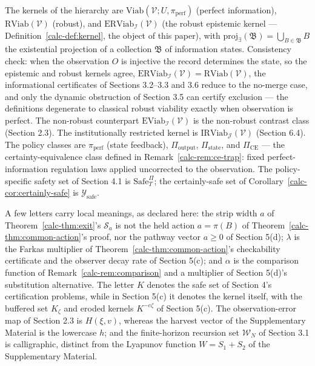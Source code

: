 \documentclass[10pt,twocolumn]{article}
\theoremstyle{definition}
\begin{document}
The kernels of the hierarchy are
\(\mathrm{Viab}(\mathcal{V}; U, \pi_{\mathrm{perf}})\) (perfect
information), \(\mathrm{RViab}(\mathcal{V})\) (robust), and
\(\mathrm{ERViab}_{\mathcal{I}}(\mathcal{V})\) (the robust epistemic
kernel --- Definition~\ref{calc-def:kernel}, the object of this paper), with
\(\mathrm{proj}_{\exists}(\mathfrak{B}) = \bigcup_{B \in \mathfrak{B}} B\)
the existential projection of a collection \(\mathfrak{B}\) of information states. Consistency check: when the observation \(O\) is injective the record determines the state, so the epistemic and robust kernels agree, \(\mathrm{ERViab}_{\mathcal{I}}(\mathcal{V}) = \mathrm{RViab}(\mathcal{V})\), the informational certificates of Sections 3.2--3.3 and 3.6 reduce to the no-merge case, and only the dynamic obstruction of Section 3.5 can certify exclusion --- the definitions degenerate to classical robust viability exactly when observation is perfect. The non-robust counterpart
\(\mathrm{EViab}_{\mathcal{I}}(\mathcal{V})\) is the non-robust contrast class (Section 2.3). The institutionally restricted kernel is \(\mathrm{IRViab}_{\mathcal{J}}(\mathcal{V})\) (Section 6.4). The policy classes
are \(\pi_{\mathrm{perf}}\) (state feedback), \(\Pi_{\mathrm{output}}\),
\(\Pi_{\mathrm{state}}\), and \(\Pi_{\mathrm{CE}}\) --- the
certainty-equivalence class defined in Remark~\ref{calc-rem:ce-trap}: fixed
perfect-information regulation laws applied uncorrected to the
observation. The policy-specific safety set of Section 4.1 is
\(\mathrm{Safe}^{\Pi}_T\); the certainly-safe set of Corollary~\ref{calc-cor:certainly-safe} is
\(\mathcal{Y}_{\mathrm{safe}}\).

A few letters carry local meanings, as declared here: the strip width \(a\) of
Theorem~\ref{calc-thm:exit}'s \(\mathcal{S}_a\) is not the held action
\(a = \pi(B)\) of Theorem~\ref{calc-thm:common-action}'s proof, nor the
pathway vector \(a \ge 0\) of Section 5(d); \(\lambda\) is the Farkas
multiplier of Theorem~\ref{calc-thm:common-action}'s checkability
certificate and the observer decay rate of Section 5(c); and
\(\alpha\) is the comparison function of Remark~\ref{calc-rem:comparison}
and a multiplier of Section 5(d)'s substitution alternative. The
letter \(K\) denotes the safe set of Section 4's certification
problems, while in Section 5(c) it denotes the kernel
itself, with the buffered set \(K_\zeta\) and eroded kernels
\(K^{-c\zeta}\) of Section 5(c). The observation-error map of
Section 2.3 is \(H(\xi, v)\), whereas the harvest vector of
the Supplementary Material is the lowercase \(h\); and the finite-horizon recursion
set \(\mathcal{W}_N\) of Section 3.1 is calligraphic, distinct from
the Lyapunov function \(W = S_1 + S_2\) of the Supplementary Material.
\end{document}
